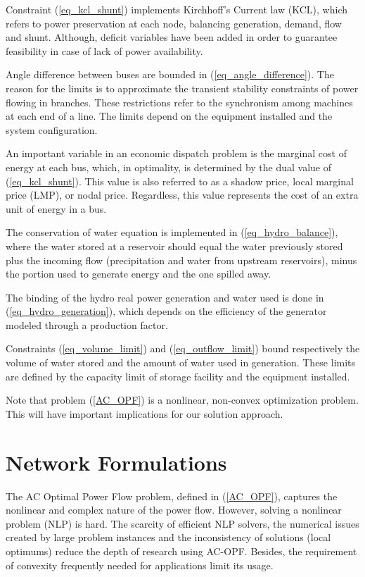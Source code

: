 \documentclass{juliacon}
\begin{document}
Constraint (\ref{eq_kcl_shunt}) implements Kirchhoff’s Current law (KCL), which refers to power preservation at each node, balancing generation, demand, flow and shunt. Although, deficit variables have been added in order to guarantee feasibility in case of lack of power availability.

Angle difference between buses are bounded in (\ref{eq_angle_difference}). The reason for the limits is to approximate the transient stability constraints of power flowing in branches. These restrictions refer to the synchronism among machines at each end of a line. The limits depend on the equipment installed and the system configuration.

An important variable in an economic dispatch problem is the marginal cost of energy at each bus, which, in optimality, is determined by the dual value of (\ref{eq_kcl_shunt}). This value is also referred to as a shadow price, local marginal price (LMP), or nodal price. Regardless, this value represents the cost of an extra unit of energy in a bus.  

The conservation of water equation is implemented in (\ref{eq_hydro_balance}), where the water stored at a reservoir should equal the water previously stored plus the incoming flow (precipitation and water from upstream reservoirs), minus the portion used to generate energy and the one spilled away.

The binding of the hydro real power generation and water used is done in (\ref{eq_hydro_generation}), which depends on the efficiency of the generator modeled through a production factor.

Constraints (\ref{eq_volume_limit}) and (\ref{eq_outflow_limit}) bound respectively the volume of water stored and the amount of water used in generation. These limits are defined by the capacity limit of storage facility and the equipment installed.

Note that problem (\ref{AC_OPF}) is a nonlinear, non-convex optimization problem. This will have important implications for our solution approach.

\section{Network Formulations}
\label{sec:powermodels}

The AC Optimal Power Flow problem, defined in (\ref{AC_OPF}), captures the nonlinear and complex nature of the power flow. However, solving a nonlinear problem (NLP) is hard. The scarcity of efficient NLP solvers, the numerical issues created by large problem instances and the inconsistency of solutions (local optimums) reduce the depth of research using AC-OPF. Besides, the requirement of convexity frequently needed for applications limit its usage. 
\end{document}
